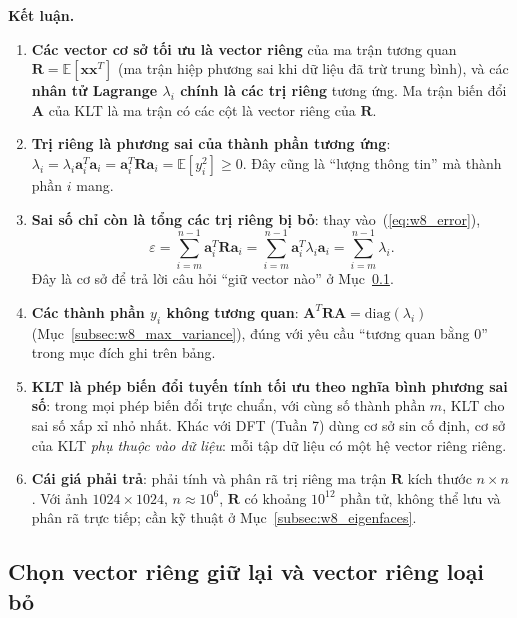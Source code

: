 \textbf{Kết luận.}
\begin{enumerate}
    \item \textbf{Các vector cơ sở tối ưu là vector riêng} của ma trận tương quan $\mathbf{R} = \mathbb{E}[\mathbf{x}\mathbf{x}^T]$ (ma trận hiệp phương sai khi dữ liệu đã trừ trung bình), và các \textbf{nhân tử Lagrange $\lambda_i$ chính là các trị riêng} tương ứng. Ma trận biến đổi $\mathbf{A}$ của KLT là ma trận có các cột là vector riêng của $\mathbf{R}$.
    \item \textbf{Trị riêng là phương sai của thành phần tương ứng}: $\lambda_i = \lambda_i\mathbf{a}_i^T\mathbf{a}_i = \mathbf{a}_i^T\mathbf{R}\mathbf{a}_i = \mathbb{E}[y_i^2] \ge 0$. Đây cũng là ``lượng thông tin'' mà thành phần $i$ mang.
    \item \textbf{Sai số chỉ còn là tổng các trị riêng bị bỏ}: thay vào~(\ref{eq:w8_error}),
    \begin{equation}
    \varepsilon = \sum_{i=m}^{n-1}\mathbf{a}_i^T\mathbf{R}\mathbf{a}_i = \sum_{i=m}^{n-1}\mathbf{a}_i^T\lambda_i\mathbf{a}_i = \sum_{i=m}^{n-1}\lambda_i.
    \end{equation}
    Đây là cơ sở để trả lời câu hỏi ``giữ vector nào'' ở Mục~\ref{subsec:w8_which_keep}.
    \item \textbf{Các thành phần $y_i$ không tương quan}: $\mathbf{A}^T\mathbf{R}\mathbf{A} = \mathrm{diag}(\lambda_i)$ (Mục~\ref{subsec:w8_max_variance}), đúng với yêu cầu ``tương quan bằng $0$'' trong mục đích ghi trên bảng.
    \item \textbf{KLT là phép biến đổi tuyến tính tối ưu theo nghĩa bình phương sai số}: trong mọi phép biến đổi trực chuẩn, với cùng số thành phần $m$, KLT cho sai số xấp xỉ nhỏ nhất. Khác với DFT (Tuần 7) dùng cơ sở sin cố định, cơ sở của KLT \emph{phụ thuộc vào dữ liệu}: mỗi tập dữ liệu có một hệ vector riêng riêng.
    \item \textbf{Cái giá phải trả}: phải tính và phân rã trị riêng ma trận $\mathbf{R}$ kích thước $n \times n$. Với ảnh $1024 \times 1024$, $n \approx 10^6$, $\mathbf{R}$ có khoảng $10^{12}$ phần tử, không thể lưu và phân rã trực tiếp; cần kỹ thuật ở Mục~\ref{subsec:w8_eigenfaces}.
\end{enumerate}

\subsection{Chọn vector riêng giữ lại và vector riêng loại bỏ}
\label{subsec:w8_which_keep}

